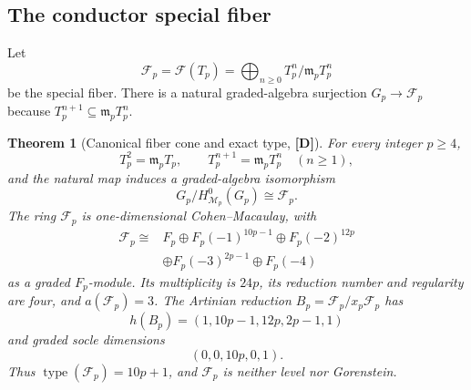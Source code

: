 \documentclass[11pt]{article}
\newtheorem{theorem}{Theorem}[section]
\theoremstyle{definition}
\theoremstyle{remark}
\begin{document}
\subsection{The conductor special fiber}

Let
\[
\mathcal F_p=\mathcal F(T_p)=\bigoplus_{n\ge0}T_p^n/\mathfrak m_pT_p^n
\]
be the special fiber. There is a natural graded-algebra surjection $G_p\to\mathcal F_p$ because
$T_p^{n+1}\subseteq\mathfrak m_pT_p^n$.

\begin{theorem}[Canonical fiber cone and exact type, {\bf[D]}]
\label{thm:fiber}
For every integer $p\ge4$,
\[
T_p^2=\mathfrak m_pT_p,
\qquad
T_p^{n+1}=\mathfrak m_pT_p^n\quad(n\ge1),
\]
and the natural map induces a graded-algebra isomorphism
\[
G_p/H^0_{\mathcal M_p}(G_p)\cong\mathcal F_p.
\]
The ring $\mathcal F_p$ is one-dimensional Cohen--Macaulay, with
\begin{align*}
\mathcal F_p\cong{}&F_p\oplus F_p(-1)^{10p-1}\oplus F_p(-2)^{12p}\\
&\oplus F_p(-3)^{2p-1}\oplus F_p(-4)
\end{align*}
as a graded $F_p$-module. Its multiplicity is $24p$, its reduction number and regularity are four,
and $a(\mathcal F_p)=3$. The Artinian reduction $B_p=\mathcal F_p/x_p\mathcal F_p$ has
\[
h(B_p)=(1,10p-1,12p,2p-1,1)
\]
and graded socle dimensions
\[
(0,0,10p,0,1).
\]
Thus $\operatorname{type}(\mathcal F_p)=10p+1$, and $\mathcal F_p$ is neither level nor
Gorenstein.
\end{theorem}
\end{document}
